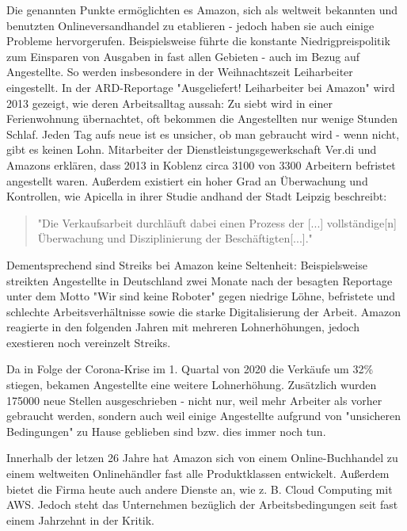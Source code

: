 Die genannten Punkte ermöglichten es Amazon, sich als weltweit bekannten und benutzten Onlineversandhandel zu etablieren - jedoch haben sie auch einige Probleme hervorgerufen. Beispielsweise führte die konstante Niedrigpreispolitik\cite[Abb. 5]{Desjardins} zum Einsparen von Ausgaben in fast allen Gebieten - auch im Bezug auf Angestellte\cite[S. 6]{Apicella}. So werden insbesondere in der Weihnachtszeit Leiharbeiter eingestellt. In der ARD-Reportage "Ausgeliefert! Leiharbeiter bei Amazon" wird 2013 gezeigt, wie deren Arbeitsalltag aussah: Zu siebt wird in einer Ferienwohnung übernachtet, oft bekommen die Angestellten nur wenige Stunden Schlaf. Jeden Tag aufs neue ist es unsicher, ob man gebraucht wird - wenn nicht, gibt es keinen Lohn. Mitarbeiter der Dienstleistungsgewerkschaft Ver.di und Amazons erklären, dass 2013 in Koblenz circa 3100 von 3300 Arbeitern befristet angestellt waren\cite{Ausgeliefert}.
Außerdem existiert ein hoher Grad an Überwachung und Kontrollen, wie Apicella in ihrer Studie andhand der Stadt Leipzig beschreibt\cite[S. 29]{Apicella}:
\begin{quote}
"Die Verkaufsarbeit durchläuft dabei einen Prozess der [...] vollständige[n] Überwachung und Disziplinierung der Beschäftigten[...]."
\end{quote}
Dementsprechend sind Streiks bei Amazon keine Seltenheit: Beispielsweise streikten Angestellte in Deutschland zwei Monate nach der besagten Reportage unter dem Motto "Wir sind keine Roboter" gegen niedrige Löhne, befristete und schlechte Arbeitsverhältnisse sowie die starke Digitalisierung der Arbeit\cite[S. 6]{Apicella}. Amazon reagierte in den folgenden Jahren mit mehreren Lohnerhöhungen, jedoch exestieren noch vereinzelt Streiks\cite{JGraf}.

Da in Folge der Corona-Krise im 1. Quartal von 2020 die Verkäufe um 32\% stiegen, bekamen Angestellte eine weitere Lohnerhöhung. Zusätzlich wurden 175000 neue Stellen ausgeschrieben - nicht nur, weil mehr Arbeiter als vorher gebraucht werden, sondern auch weil einige Angestellte aufgrund von "unsicheren Bedingungen" zu Hause geblieben sind bzw. dies immer noch tun\cite{Theweek}.

Innerhalb der letzen 26 Jahre hat Amazon sich von einem Online-Buchhandel zu einem weltweiten Onlinehändler fast alle Produktklassen entwickelt. Außerdem bietet die Firma heute auch andere Dienste an, wie z. B. Cloud Computing mit \ac{AWS}. Jedoch steht das Unternehmen bezüglich der Arbeitsbedingungen seit fast einem Jahrzehnt in der Kritik.

